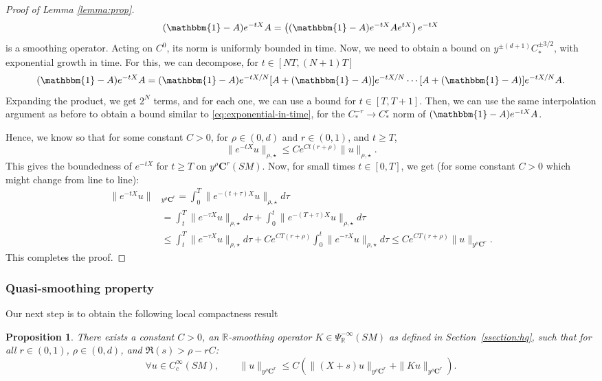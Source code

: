 \documentclass[10pt]{amsart}
\newcommand{\bC}{\boldsymbol{C}}
\newcommand{\R}{\mathbb{R}}
\theoremstyle{plain}
\newtheorem{proposition}{Proposition}[section]
\theoremstyle{definition}
\begin{document}
\begin{proof}[Proof of Lemma \ref{lemma:prop}]
\[
(\mathbbm{1}-A) e^{-tX} A = \left((\mathbbm{1}-A) e^{-tX} A e^{tX}\right)e^{-tX}
\]
is a smoothing operator. Acting on $C^0$, its norm is uniformly bounded in time. Now, we need to obtain a bound on $y^{\pm (d+1)}C^{\pm 3/2}_*$, with exponential growth in time. For this, we can decompose, for $t\in [NT, (N+1)T]$
\[
(\mathbbm{1}-A) e^{-t X} A = (\mathbbm{1}-A) e^{-tX/N}[ A+ (\mathbbm{1}-A)]e^{-tX/N}\cdots [A+(\mathbbm{1}-A)] e^{-tX/N}A.
\]
Expanding the product, we get $2^N$ terms, and for each one, we can use a bound for $t\in [T,T+1]$. Then, we can use the same interpolation argument as before to obtain a bound similar to \eqref{eq:exponential-in-time}, for the $C^{-r}_*\to C^r_*$ norm of $(\mathbbm{1}-A)e^{-tX} A$.

Hence, we know so that for some constant $C > 0$, for $\rho\in (0,d)$ and $r\in (0,1)$, and $t\geq T$,
\[
\| e^{-tX}u\|_{\rho,\star} \leq C e^{C t (r+ \rho)} \|u\|_{\rho,\star}.
\]
This gives the boundedness of $e^{-tX}$ for $t\geq T$ on $y^\rho \bC^r(SM)$. Now, for small times $t\in [0,T]$, we get (for some constant $C >0$ which might change from line to line):
\[
\begin{split}
\|e^{-tX}u\|&_{y^\rho \bC^r} = \int_0^T \| e^{-(t+\tau)X}u\|_{\rho,\star} d\tau \\
& = \int_t^T \|e^{-\tau X}u\|_{\rho,\star} d \tau + \int_0^t \|e^{-(T+\tau)X}u\|_{\rho,\star} d \tau \\
& \leq \int_t^T \|e^{-\tau X}u\|_{\rho,\star} d \tau + C e^{CT(r+\rho)} \int_0^t \|e^{-\tau X}u\|_{\rho,\star} d \tau \leq Ce^{CT(r+\rho)} \|u\|_{y^\rho \bC^r}.
\end{split}
\]
This completes the proof.
\end{proof}

\subsubsection{Quasi-smoothing property}

\label{sssection:smoothing}

Our next step is to obtain the following local compactness result
\begin{proposition}\label{prop:quasi-smoothing}
There exists a constant $C > 0$, an $\R$-smoothing operator $K \in \Psi^{-\infty}_{\R}(SM)$ as defined in Section~\ref{ssection:hq}, such that for all $r \in (0,1)$, $\rho \in (0,d)$, and $\Re(s) > \rho-rC$:
\[
\forall u \in C^\infty_{c}(SM), \qquad \|u\|_{y^\rho \bC^r} \leq C \left(\| (X+s)u\|_{y^\rho\bC^r} + \| K u\|_{y^\rho\bC^r}\right).
\]
\end{proposition}
\end{document}
